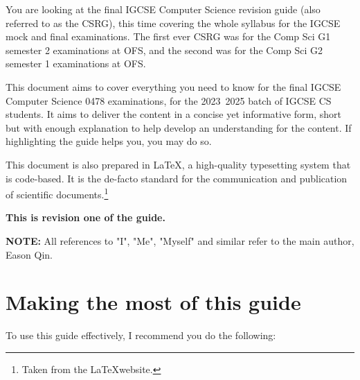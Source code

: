 \documentclass[../main.tex]{subfiles}
\begin{document}
You are looking at the final IGCSE Computer Science revision guide (also referred to as the CSRG), this time covering the whole syllabus for the IGCSE mock and final examinations. The first ever CSRG was for the Comp Sci G1 semester 2 examinations at OFS, and the second was for the Comp Sci G2 semester 1 examinations at OFS.

This document aims to cover everything you need to know for the final IGCSE Computer Science 0478 examinations, for the 2023~2025 batch of IGCSE CS students. It aims to deliver the content in a concise yet informative form, short but with enough explanation to help develop an understanding for the content. If highlighting the guide helps you, you may do so.

This document is also prepared in \LaTeX, a high-quality typesetting system that is code-based. It is the de-facto standard for the communication and publication of scientific documents.\footnote{Taken from the \LaTeX website.}

\textbf{This is revision one of the guide.}

\textbf{NOTE:} All references to "I", "Me", "Myself" and similar refer to the main author, Eason Qin.

\section*{Making the most of this guide}

To use this guide effectively, I recommend you do the following:
\end{document}
